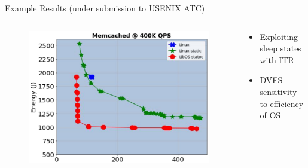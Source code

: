\documentclass[notes=only,10pt,xcolor=table]{beamer}
\begin{document}
\begin{frame}{Example Results (under submission to USENIX ATC)}
\begin{columns}
    \begin{column}{.6\textwidth}
        \begin{figure}
            \includegraphics[width=1\textwidth]{img/mcd400K.pdf}
        \end{figure}
    \end{column}
    \begin{column}{.4\textwidth}
        \begin{itemize}
            \item Exploiting sleep states with ITR
            \item DVFS sensitivity to efficiency of OS
        \end{itemize}
    \end{column}
\end{columns}  
\end{frame}
\end{document}
